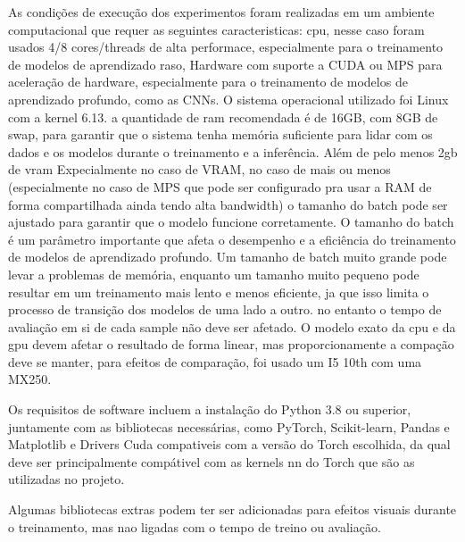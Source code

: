 \documentclass[conference]{IEEEtran}
\begin{document}
As condições de execução dos experimentos foram realizadas em um ambiente computacional que requer as seguintes caracteristicas:
cpu, nesse caso foram usados 4/8 cores/threads de alta performace, especialmente para o treinamento de modelos de aprendizado raso, 
Hardware com suporte a CUDA ou MPS para aceleração de hardware, especialmente para o treinamento de modelos de aprendizado profundo, como as CNNs. O sistema operacional utilizado foi Linux com a kernel 6.13.
a quantidade de ram recomendada é de 16GB, com 8GB de swap, para garantir que o sistema tenha memória suficiente para lidar com os dados e os modelos durante o treinamento e a inferência. Além de pelo menos 2gb de vram
Expecialmente no caso de VRAM, no caso de mais ou menos (especialmente no caso de MPS que pode ser configurado pra usar a RAM de forma compartilhada ainda tendo alta bandwidth) o tamanho do batch pode ser ajustado para garantir que o modelo funcione corretamente. O tamanho do batch é um parâmetro importante que afeta o desempenho e a eficiência do treinamento de modelos de aprendizado profundo. Um tamanho de batch muito grande pode levar a problemas de memória, enquanto um tamanho muito pequeno pode resultar em um treinamento mais lento e menos eficiente, ja que isso limita o processo de transição dos modelos de uma lado a outro. no entanto o tempo de avaliação em si de cada sample não deve ser afetado.
O modelo exato da cpu e da gpu devem afetar o resultado de forma linear, mas proporcionamente a compação deve se manter, para efeitos de comparação, foi usado um I5 10th com uma MX250. 

Os requisitos de software incluem a instalação do Python 3.8 ou superior, juntamente com as bibliotecas necessárias, como PyTorch, Scikit-learn, Pandas e Matplotlib e Drivers Cuda compativeis com a versão do Torch escolhida, da qual deve ser principalmente compátivel com as kernels nn do Torch que são as utilizadas no projeto.

Algumas bibliotecas extras podem ter ser adicionadas para efeitos visuais durante o treinamento, mas nao ligadas com o tempo de treino ou avaliação.
\end{document}
